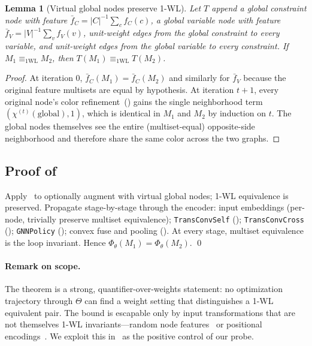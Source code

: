 \documentclass[11pt]{article}
\theoremstyle{plain}
\newtheorem{lemma}{Lemma}
\theoremstyle{definition}
\theoremstyle{remark}
\begin{document}
\begin{lemma}[Virtual global nodes preserve 1-WL]\label{lem:virtnode}
Let $T$ append a global constraint node with feature
$\bar f_C = |C|^{-1}\sum_c f_C(c)$, a global variable node with feature
$\bar f_V = |V|^{-1}\sum_v f_V(v)$, unit-weight edges from the global
constraint to every variable, and unit-weight edges from the global variable
to every constraint. If $M_1 \equiv_{1\text{WL}} M_2$, then
$T(M_1) \equiv_{1\text{WL}} T(M_2)$.
\end{lemma}
\begin{proof}
At iteration 0, $\bar f_C(M_1)=\bar f_C(M_2)$ and similarly for $\bar f_V$
because the original feature multisets are equal by hypothesis. At iteration
$t{+}1$, every original node's color refinement~() gains the
single neighborhood term $(\chi^{(t)}(\text{global}), 1)$, which is identical
in $M_1$ and $M_2$ by induction on $t$. The global nodes themselves see the
entire (multiset-equal) opposite-side neighborhood and therefore share the
same color across the two graphs. \qedhere
\end{proof}

\subsection{Proof of }

Apply~ to optionally augment with virtual global nodes;
1-WL equivalence is preserved. Propagate stage-by-stage through the encoder:
input embeddings (per-node, trivially preserve multiset equivalence);
\texttt{TransConvSelf} (); \texttt{TransConvCross}
(); \texttt{GNNPolicy} (); convex fuse and
pooling (). At every stage, multiset equivalence is the
loop invariant. Hence $\Phi_\theta(M_1) = \Phi_\theta(M_2)$. \qed

\paragraph{Remark on scope.}
The theorem is a strong, quantifier-over-weights statement: no
optimization trajectory through $\Theta$ can find a weight setting that
distinguishes a 1-WL equivalent pair. The bound is escapable only by input
transformations that are not themselves 1-WL invariants---random node
features~\cite{abboud2020rni, sato2021random} or positional
encodings~\cite{dwivedi2022rwpe}. We exploit this in~ as the
positive control of our probe.
\end{document}
